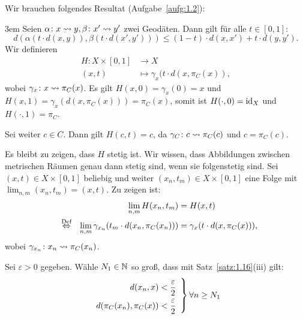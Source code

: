 \begin{beweis}
	Wir brauchen folgendes Resultat (Aufgabe~\ref{aufg:1.2}):
	
	\vspace*{.5cm}
	
	{\leftskip3em
	Seien $\alpha\colon x \rightsquigarrow y, \beta\colon x' \rightsquigarrow y'$ zwei Geodäten.
	Dann gilt für alle $t \in [0,1]$:
	\begin{equation}
		d(\alpha(t\cdot d(x,y)), \beta(t \cdot d(x',y'))) \leq (1-t) \cdot d(x,x') + t \cdot d(y,y'). \label{eq:1.19.1}
	\end{equation} }
	\vspace{-1em}
	Wir definieren
	\begin{align*}
		H\colon X \times [0,1] &\longrightarrow X \\
		(x,t) &\longmapsto \gamma_x(t \cdot d(x,\pi_C(x)),
	\end{align*}
	wobei $\gamma_x\colon x \rightsquigarrow \pi_C(x)$. Es gilt $H(x,0) = \gamma_x(0) = x$ und $H(x,1) = \gamma_x(d(x,\pi_C(x))) = \pi_C(x)$, somit ist $H(\cdot,0) = \operatorname{id}_X$ und $H(\cdot,1) = \pi_C$.
	
	Sei weiter $c \in C$. Dann gilt $H(c,t) = c$, da $\gamma_C\colon c \rightsquigarrow \pi_C(c)$ und $c = \pi_C(c)$.
	
	Es bleibt zu zeigen, dass $H$ stetig ist.
	Wir wissen, dass Abbildungen zwischen metrischen Räumen genau dann stetig sind, wenn sie folgenstetig sind.
	Sei $(x,t) \in X \times [0,1]$ beliebig und weiter $(x_n,t_m) \in X \times [0,1]$ eine Folge mit $\lim_{n,m} (x_n,t_m) = (x,t)$. Zu zeigen ist:
	\begin{align*}
		\lim\limits_{n,m} H(x_n,t_m) &= H(x,t) \\
		\stack{\text{Def}}{\Leftrightarrow} \lim\limits_{n,m} \gamma_{x_n}(t_m \cdot d(x_n,\pi_C(x_n))) &= \gamma_x(t \cdot d(x,\pi_C(x))),
	\end{align*}
	wobei $\gamma_{x_n}\colon x_n \rightsquigarrow \pi_C(x_n)$.
	
	Sei $\varepsilon > 0$ gegeben. Wähle $N_1 \in \mathbb{N}$ so groß, dass mit Satz~\ref{satz:1.16}(iii) gilt:
	\begin{equation} \def\arraystretch{1.8}
		\left. \begin{array}{r}
			\displaystyle d(x_n,x) < \frac{\varepsilon}{2} \\
			\displaystyle d(\pi_C(x_n),\pi_C(x)) < \frac{\varepsilon}{2}
		\end{array} \right\} \forall n \geq N_1 \label{eq:1.19.2}
	\end{equation}
	

\end{beweis}
